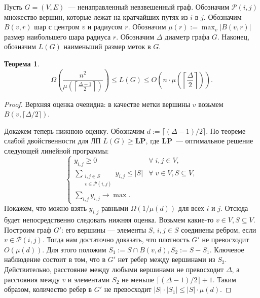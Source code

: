 \documentclass[12pt]{article}
\newcommand{\Pc}{\mathcal{P}}
\newcommand{\abs}[1]{\left|#1\right|}
\newtheorem{theorem}{Теорема}
\begin{document}
    Пусть $G = (V, E)$~--- ненаправленный невзвешенный граф.
    Обозначим $\Pc(i, j)$ множество вершин, которые лежат на кратчайших путях из $i$ в $j$.
    Обозначим $B(v, r)$ шар с центром $v$ и радиусом $r$. Обозначим $\mu(r) := \max_v |B(v, r)|$ размер наибольшего шара радиуса $r$.
    Обозначим $\Delta$ диаметр графа $G$. Наконец, обозначим $L(G)$ наименьший размер меток в $G$.

    \begin{theorem}
        $$
            \Omega\left(\frac{n^2}{\mu(\left\lceil \frac{\Delta - 1}{2} \right\rceil)}\right) \leq L(G)
            \leq O\left(n \cdot \mu\left(\left\lceil\frac{\Delta}{2}\right\rceil\right)\right).
        $$
    \end{theorem}
    \begin{proof}
        Верхняя оценка очевидна: в качестве метки вершины $v$ возьмем $B(v, \lceil \Delta / 2 \rceil)$.

        Докажем теперь нижнюю оценку. Обозначим $d := \lceil (\Delta - 1) / 2 \rceil$.
        По теореме слабой двойственности для ЛП $L(G) \geq \mathbf{LP}$, где $\mathbf{LP}$~--- оптимальное решение следующей линейной программы:
        \begin{equation}
            \label{dual_lp}
            \begin{cases}
                y_{i,j} \geq 0 & \forall \; i, j \in V, \\ 
                \sum_{\begin{smallmatrix}i, j \in S \\ v \in \Pc(i, j)\end{smallmatrix}} y_{i,j} \leq \abs{S} & \forall \; v \in V, S \subseteq V,  \\
                \sum_{i,j} y_{i,j} \to \max.
            \end{cases}
        \end{equation}
        Покажем, что можно взять $y_{i,j}$ равными $\Omega(1 / \mu(d))$ для всех $i$ и $j$. Отсюда будет непосредственно
        следовать нижняя оценка.
        Возьмем какие-то $v \in V, S \subseteq V$.
        Построим граф $G'$: его вершины --- элементы $S$, $i, j \in S$ соединены ребром, если $v \in \Pc(i, j)$.
        Тогда нам достаточно доказать, что плотность $G'$ не превосходит $O(\mu(d))$.
        Для этого положим $S_1 := S \cap B(v, d), S_2 := S - S_1$.
        Ключевое наблюдение состоит в том, что в $G'$ нет ребер между вершинами из $S_2$.
        Действительно, расстояние между любыми вершинами не превосходит $\Delta$, а расстояния между $v$ и элементами $S_2$ не меньше 
        $\lceil (\Delta - 1) / 2 \rceil + 1$.
        Таким образом, количество ребер в $G'$ не превосходит $|S| \cdot |S_1| \leq |S| \cdot \mu(d)$.

    \end{proof}
\end{document}
